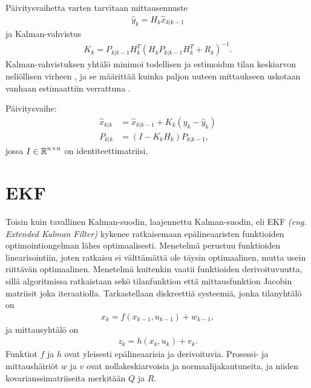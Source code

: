Päivitysvaihetta varten tarvitaan mittausennuste
\begin{align}
    \hat{y}_k = H_k \hat{x}_{k | k-1} 
\end{align}
ja Kalman-vahvistus 
\begin{align}
    K_k = P_{k | k-1} H_k^T \left(H_k P_{k | k-1} H_k^T + R_k \right)^{-1}.
\end{align}
Kalman-vahvistuksen yhtälö minimoi todellisen ja estimoidun tilan keskiarvon neliöllisen virheen \cite{sparse_kalman_gain}, ja se määrittää kuinka paljon uuteen mittaukseen uskotaan vanhaan estimaattiin verrattuna \cite{becker2023kalman}.

Päivitysvaihe:
\begin{align}
    \hat{x}_{k | k} &= \hat{x}_{k | k-1} + K_k (y_k - \hat{y}_k)\\
    P_{k|k}         &= (I - K_k H_k)P_{k|k-1},
\end{align}
jossa \(I \in \operatorname{\mathbb{R}}^{n\times n}\) on identiteettimatriisi.

\section{EKF}
Toisin kuin tavallinen Kalman-suodin, laajennettu Kalman-suodin, eli EKF \emph{(eng. Extended Kalman Filter)} kykenee ratkaisemaan epälineaaristen funktioiden optimointiongelman lähes optimaalisesti. Menetelmä perustuu funktioiden linearisointiin, joten ratkaisu ei välttämättä ole täysin optimaalinen, mutta usein riittävän optimaalinen. Menetelmä kuitenkin vaatii funktioiden derivoituvuutta, sillä algoritmissa ratkaistaan sekö tilanfunktion että mittausfunktion Jacobin matriisit joka iteraatiolla. Tarkastellaan diskreettiä systeemiä, jonka tilanyhtälö on
\begin{align}
    x_k = f(x_{k-1}, u_{k-1}) + w_{k-1},
\end{align}
ja mittausyhtälö on
\begin{align}
    z_k = h(x_{k}, u_{k}) + v_k.
\end{align}
Funktiot \(f\) ja \(h\) ovat yleisesti epälineaarisia ja derivoituvia. Prosessi- ja mittaushäiriöt \(w\) ja \(v\) ovat nollakeskiarvoisia ja normaalijakautuneita, ja niiden kovarianssimatriiseita merkitään \(Q\) ja \(R\).

